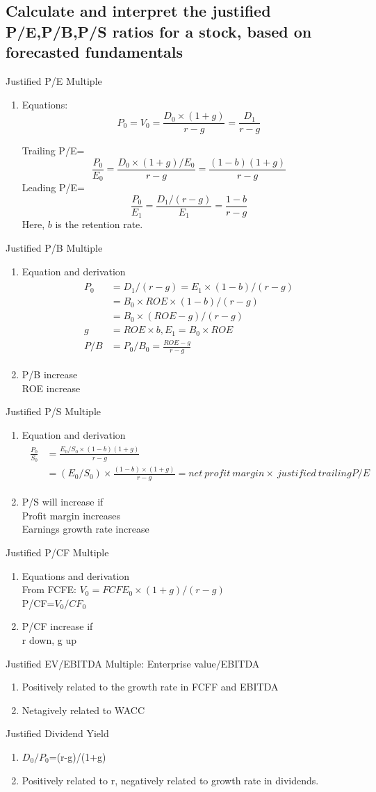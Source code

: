 \documentclass{article}
\newcommand{\be}{\begin{enumerate}}
\newcommand{\ee}{\end{enumerate}}
\newcommand{\eq}[1]{\begin{align*}\begin{split}#1\end{split}\end{align*}}
\begin{document}
\subsection{Calculate and interpret the justified P/E,P/B,P/S ratios for a stock, based on forecasted
fundamentals}
Justified P/E Multiple
\be
    \item Equations:
        $$
        P_0=V_0=\frac{D_0\times (1+g)}{r-g}=\frac{D_1}{r-g}
        $$
        
        Trailing P/E=$$\frac{P_0}{E_0}=\frac{D_0\times(1+g)/E_0}{r-g}=\frac{(1-b)(1+g)}{r-g}
        $$
        Leading P/E=$$
        \frac{P_0}{E_1}=\frac{D_1/(r-g)}{E_1}=\frac{1-b}{r-g}
        $$
        Here, $b$ is the retention rate.
\ee
Justified P/B Multiple
\be
    \item Equation and derivation
        \eq{
            P_0&=D_1/(r-g)=E_1\times (1-b)/(r-g)\\
               &=B_0\times ROE\times(1-b)/(r-g)\\
               &=B_0\times (ROE-g)/(r-g)\\
            g&=ROE\times b, E_1=B_0\times ROE\\
            P/B&=P_0/B_0=\frac{ROE-g}{r-g}
        }
    \item P/B increase
        \\ ROE increase
\ee
Justified P/S Multiple
\be
    \item Equation and derivation
        \eq{
            \frac{P_0}{S_0}&=\frac{E_0/S_0\times(1-b)(1+g)}{r-g}\\
                &=(E_0/S_0)\times\frac{(1-b)\times(1+g)}{r-g}=net\ profit\ margin\times\ justified\ 
            trailing P/E
        }
    \item P/S will increase if
        \\Profit margin increases
        \\Earnings growth rate increase
\ee
Justified P/CF Multiple
\be
    \item Equations and derivation
        \\From FCFE: $V_0=FCFE_0\times(1+g)/(r-g)$
        \\P/CF=$V_0/CF_0$
    \item P/CF increase if
        \\r down, g up
\ee
Justified EV/EBITDA Multiple: Enterprise value/EBITDA
\be
    \item Positively related to the growth rate in FCFF and EBITDA
    \item Netagively related to WACC
\ee
Justified Dividend Yield
\be
    \item $D_0/P_0$=(r-g)/(1+g)
    \item Positively related to r, negatively related to growth rate in dividends.
\ee
\end{document}
